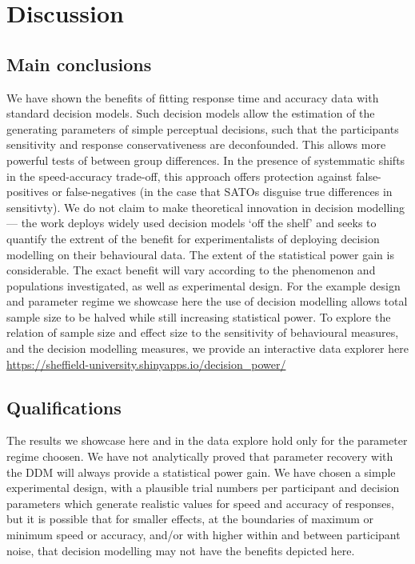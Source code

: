\documentclass[floatsintext,doc]{apa6}
\theoremstyle{definition}
\theoremstyle{definition}
\theoremstyle{definition}
\theoremstyle{remark}
\begin{document}
\section{Discussion}\label{discussion}

\subsection{Main conclusions}\label{main-conclusions}

We have shown the benefits of fitting response time and accuracy data
with standard decision models. Such decision models allow the estimation
of the generating parameters of simple perceptual decisions, such that
the participants sensitivity and response conservativeness are
deconfounded. This allows more powerful tests of between group
differences. In the presence of systemmatic shifts in the speed-accuracy
trade-off, this approach offers protection against false-positives or
false-negatives (in the case that SATOs disguise true differences in
sensitivty). We do not claim to make theoretical innovation in decision
modelling --- the work deploys widely used decision models `off the
shelf' and seeks to quantify the extrent of the benefit for
experimentalists of deploying decision modelling on their behavioural
data. The extent of the statistical power gain is considerable. The
exact benefit will vary according to the phenomenon and populations
investigated, as well as experimental design. For the example design and
parameter regime we showcase here the use of decision modelling allows
total sample size to be halved while still increasing statistical power.
To explore the relation of sample size and effect size to the
sensitivity of behavioural measures, and the decision modelling
measures, we provide an interactive data explorer here
\url{https://sheffield-university.shinyapps.io/decision_power/}

\subsection{Qualifications}\label{qualifications}

The results we showcase here and in the data explore hold only for the
parameter regime choosen. We have not analytically proved that parameter
recovery with the DDM will always provide a statistical power gain. We
have chosen a simple experimental design, with a plausible trial numbers
per participant and decision parameters which generate realistic values
for speed and accuracy of responses, but it is possible that for smaller
effects, at the boundaries of maximum or minimum speed or accuracy,
and/or with higher within and between participant noise, that decision
modelling may not have the benefits depicted here.
\end{document}
